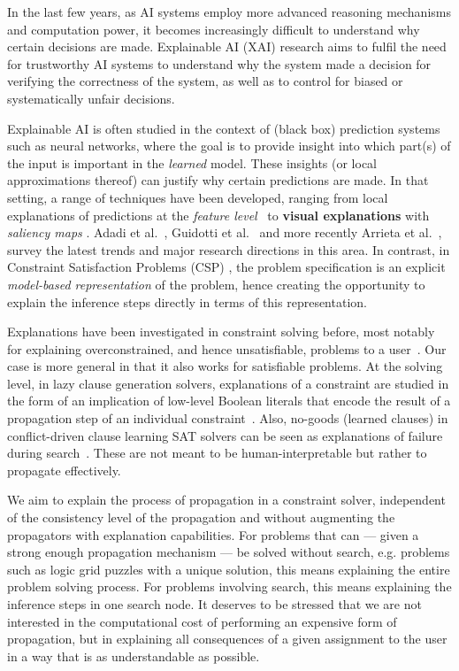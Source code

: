 
In the last few years, as AI systems employ more advanced reasoning mechanisms and computation power, it becomes increasingly difficult to understand why certain decisions are made. 
Explainable AI (XAI) research aims to fulfil the need for trustworthy AI systems to understand why the system made a decision for verifying the correctness of the system, as well as to control for biased or systematically unfair decisions.

Explainable AI is often studied in the context of (black box) prediction systems such as neural networks, where the goal is to provide insight into which part(s) of the input is important in the \textit{learned} model. 
These insights (or local approximations thereof) can justify why certain predictions are made. 
In that setting, a range of techniques have been developed, ranging from local explanations of predictions at the \textit{feature level}~\cite{ribeiro2016should,lundberg2017unified} to \textbf{visual explanations} with \textit{saliency maps} \cite{selvaraju2017grad}. %
Adadi et al.~\cite{Adadi_2018}, Guidotti et al.~\cite{guidotti2018survey} and more recently Arrieta et al.~\cite{Barredo_Arrieta_2020}, survey the latest trends and  major research directions in this area.
In contrast, in Constraint Satisfaction Problems (CSP) \cite{fai/Rossi06}, the problem specification is an explicit \textit{model-based representation} of the problem, hence creating the opportunity to explain the inference steps directly in terms of this representation.

Explanations have been investigated in constraint solving before, most notably for explaining overconstrained, and hence unsatisfiable, problems to a user~\cite{junker2001quickxplain}.
Our case is more general in that it also works for satisfiable problems.
At the solving level, in lazy clause generation solvers, explanations of a constraint are studied in the form of an implication of low-level Boolean literals that encode the result of a propagation step of an individual constraint~\cite{feydy2009lazy}. 
Also, no-goods (learned clauses) in conflict-driven clause learning SAT solvers can be seen as explanations of failure during search~\cite{marques2009conflict}. 
These are not meant to be human-interpretable but rather to propagate effectively.

We aim to explain the process of propagation in a constraint solver, independent of the consistency level of the propagation and without augmenting the propagators with explanation capabilities.
For problems that can --- given a strong enough propagation mechanism --- be solved without search, e.g. problems such as logic grid puzzles with a unique solution, this means explaining the entire problem solving process. 
For problems involving search, this means explaining the inference steps  in one search node. 
It deserves to be stressed that we are not interested in the computational cost of performing an expensive form of propagation, but in explaining all consequences of a given assignment to the user in a way that is as understandable as possible. 

